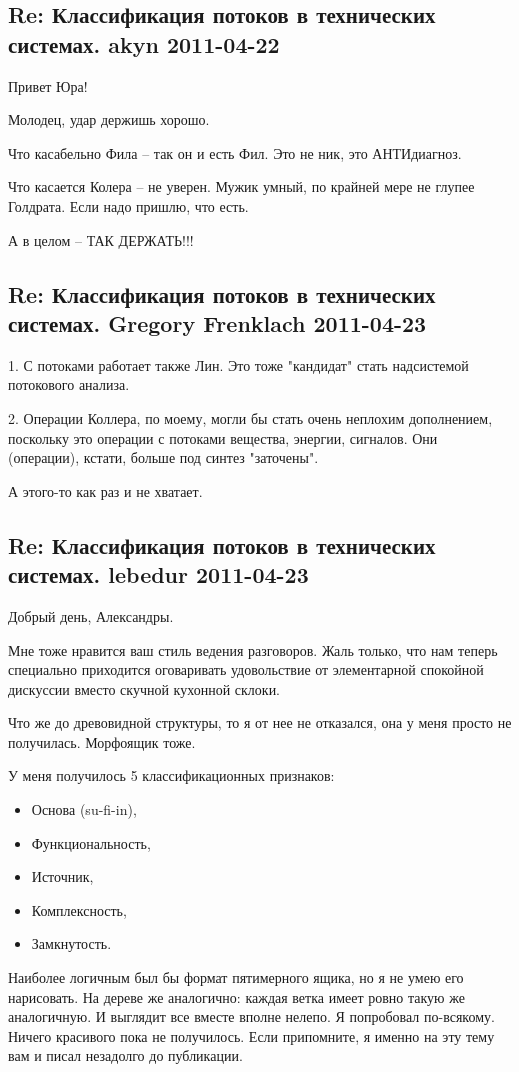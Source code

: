 \documentclass[a4paper,11pt]{article}
\begin{document}
\subsection*{Re: Классификация потоков в технических системах. akyn 2011-04-22}

Привет Юра!

Молодец, удар держишь хорошо.

Что касабельно Фила -- так он и есть Фил. Это не ник, это АНТИдиагноз.

Что касается Колера – не уверен. Мужик умный, по крайней мере не глупее
Голдрата. Если надо пришлю, что есть.

А в целом – ТАК ДЕРЖАТЬ!!!

\subsection*{Re: Классификация потоков в технических системах. Gregory
  Frenklach 2011-04-23}

1. С потоками работает также Лин.  Это тоже "кандидат" стать надсистемой
потокового анализа.

2. Операции Коллера, по моему, могли бы стать очень неплохим дополнением,
поскольку это операции с потоками вещества, энергии, сигналов.  Они
(операции), кстати, больше под синтез "заточены".

А этого-то как раз и не хватает.

\subsection*{Re: Классификация потоков в технических системах. lebedur
  2011-04-23} 

Добрый день, Александры.

Мне тоже нравится ваш стиль ведения разговоров. Жаль только, что нам теперь
специально приходится оговаривать удовольствие от элементарной спокойной
дискуссии вместо скучной кухонной склоки.

Что же до древовидной структуры, то я от нее не отказался, она у меня просто
не получилась. Морфоящик тоже.

У меня получилось 5 классификационных признаков:
\begin{itemize}
\item Основа (su-fi-in),
\item Функциональность,
\item Источник,
\item Комплексность,
\item Замкнутость.
\end{itemize}
Наиболее логичным был бы формат пятимерного ящика, но я не умею его нарисовать.
На дереве же аналогично: каждая ветка имеет ровно такую же аналогичную. И
выглядит все вместе вполне нелепо. Я попробовал по-всякому. Ничего красивого
пока не получилось. Если припомните, я именно на эту тему вам и писал
незадолго до публикации.
\end{document}
